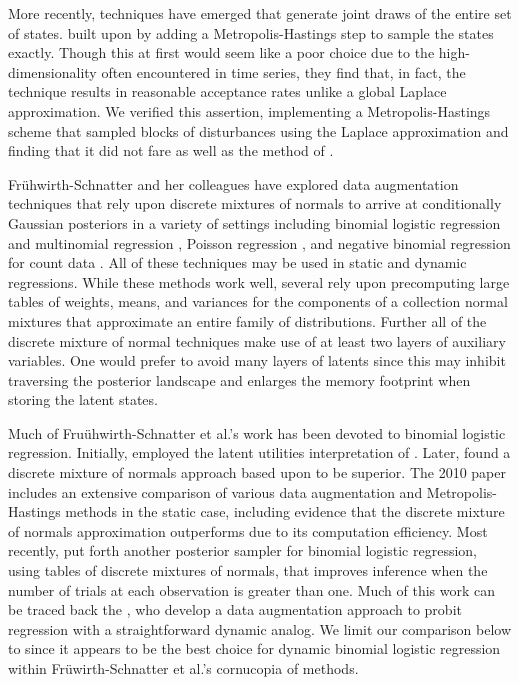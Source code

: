 \documentclass[11pt]{article}
\begin{document}
More recently, techniques have emerged that generate joint draws of the entire
set of states.  \cite{ravines-etal-2006} built upon \cite{west-etal-1985} by
adding a Metropolis-Hastings step to sample the states exactly.  Though this at
first would seem like a poor choice due to the high-dimensionality often
encountered in time series, they find that, in fact, the technique results in
reasonable acceptance rates unlike a global Laplace approximation.  We verified
this assertion, implementing a Metropolis-Hastings scheme that sampled blocks of
disturbances using the Laplace approximation and finding that it did not fare as
well as the method of \cite{ravines-etal-2006}.

Fr\"{u}hwirth-Schnatter and her colleagues have explored data augmentation
techniques that rely upon discrete mixtures of normals to arrive at
conditionally Gaussian posteriors in a variety of settings including binomial
logistic regression and multinomial regression
\citep{fruhwirth-schnatter-fruhwirth-2007, fruhwirth-schnatter-fruhwirth-2010,
  fussl-etal-2013}, Poisson regression \citep{fruhwirth-schnatter-wagner-2006,
  fruhwirth-schnatter-etal-2009}, and negative binomial regression for count
data \citep{fruhwirth-schnatter-etal-2009}.  All of these techniques may be used
in static and dynamic regressions.  While these methods work well, several rely
upon precomputing large tables of weights, means, and variances for the
components of a collection normal mixtures that approximate an entire family of
distributions.  Further all of the discrete mixture of normal techniques make
use of at least two layers of auxiliary variables.  One would prefer to avoid
many layers of latents since this may inhibit traversing the posterior landscape
and enlarges the memory footprint when storing the latent states.

Much of Fru\"{u}hwirth-Schnatter et al.'s work has been devoted to binomial
logistic regression. Initially, \cite{fruhwirth-schnatter-fruhwirth-2007}
employed the latent utilities interpretation of \cite{mcfadden-1974}.  Later,
\citep{fruhwirth-schnatter-fruhwirth-2010} found a discrete mixture of normals
approach based upon \cite{holmes-held-2006} to be superior. The 2010 paper
includes an extensive comparison of various data augmentation and
Metropolis-Hastings methods in the static case, including evidence that the
discrete mixture of normals approximation outperforms \cite{holmes-held-2006}
due to its computation efficiency.  Most recently, \cite{fussl-etal-2013} put
forth another posterior sampler for binomial logistic regression, using tables
of discrete mixtures of normals, that improves inference when the number of
trials at each observation is greater than one.  Much of this work can be traced
back the \cite{albert-chib-1993}, who develop a data augmentation approach to
probit regression with a straightforward dynamic analog.  We limit our
comparison below to \cite{fussl-etal-2013} since it appears to be the best
choice for dynamic binomial logistic regression within Fr\"{u}wirth-Schnatter et
al.'s cornucopia of methods.
\end{document}
